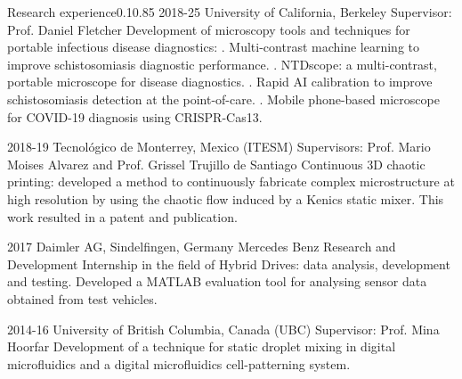 \documentclass{federico_cv}
\begin{document}







\begin{tblSection}{Research experience}{0.1}{0.85} %
\job
{2018-25}
{University of California, Berkeley}
{Supervisor: Prof. Daniel Fletcher}
{Development of microscopy tools and techniques for portable infectious disease diagnostics:}
{. Multi-contrast machine learning to improve schistosomiasis diagnostic performance.}
{. NTDscope: a multi-contrast, portable microscope for disease diagnostics.}
{. Rapid AI calibration to improve schistosomiasis detection at the point-of-care.}
{. Mobile phone-based microscope for COVID-19 diagnosis using CRISPR-Cas13.}

\job
{2018-19}
{Tecnológico de Monterrey, Mexico (ITESM)}
{Supervisors: Prof. Mario Moises Alvarez and Prof. Grissel Trujillo de Santiago}
{Continuous 3D chaotic printing: developed a method to continuously fabricate complex microstructure at high resolution by using the chaotic flow induced by a Kenics static mixer. This work resulted in a patent and publication.}

\job
{2017}
{Daimler AG, Sindelfingen, Germany}
{Mercedes Benz Research and Development}
{Internship in the field of Hybrid Drives: data analysis, development and testing. Developed a MATLAB evaluation tool for analysing sensor data obtained from test vehicles.}

\job
{2014-16}
{University of British Columbia, Canada (UBC)}
{Supervisor: Prof. Mina Hoorfar}
{Development of a technique for static droplet mixing in digital microfluidics and a digital microfluidics cell-patterning system.}

\end{tblSection}
\end{document}
